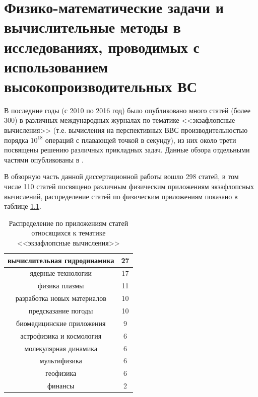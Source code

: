 \chapter{Физико-математические задачи и вычислительные методы в исследованиях, проводимых с использованием высокопроизводительных ВС} \label{chapt2}
В последние годы (с 2010 по 2016 год) было опубликовано много статей (более 300) в различных международных журналах по тематике <<экзафлопсные вычисления>> (т.е. вычисления на перспективных ВВС производительностью порядка $10^{18}$ операций с плавающей точкой в секунду), из них около трети посвящены решению различных прикладных задач.
Данные обзора отдельными частями опубликованы в \cite{MohographyTarkov,VestnikNNSU,multigridAuto,AutoParSilan,VychMetPlasma,Adaptive,VestnikNSU3D,NumMethMultiLevel,MatMod,VestnikNSUadapt,VychMethProgExa,SuperFrI,adaptCPC,LotovPoP,astroCoDesign,integrApproach}.

В обзорную часть данной диссертационной работы вошло 298 статей, в том числе 110 статей посвящено различным физическим приложениям экзафлопсных вычислений, распределение статей по физическим приложениям показано в таблице \ref{tab_physics}.


\begin{table}[ht]
	\caption{Распределение по приложениям статей относящихся к тематике <<экзафлопсные вычисления>>}
	\begin{center}
		\begin{tabular}{|c|c|}
			\hline
			вычислительная гидродинамика & 27  \\ \hline 
			ядерные технологии & 17       \\ \hline  
			физика плазмы & 11  \\ \hline 
			разработка новых материалов & 10  \\ \hline 
			предсказание погоды & 10 \\ \hline 
			биомедицинские приложения & 9 \\ \hline 
			астрофизика и космология & 6  \\ \hline 
			молекулярная динамика   & 6   \\ \hline 
			мультифизика & 6              \\ \hline 
			геофизика & 6  \\ \hline 
			финансы & 2  \\ \hline 
		\end{tabular}
	\end{center}
	\label{tab_physics}
\end{table}

